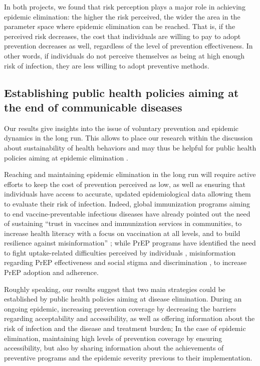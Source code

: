 In both projects, we found that risk perception plays a major role in achieving epidemic elimination: the higher the risk perceived, the wider the area in the parameter space where epidemic elimination can be reached. That is, if the perceived risk decreases, the cost that individuals are willing to pay to adopt prevention decreases as well, regardless of the level of prevention effectiveness. In other words, if individuals do not perceive themselves as being at high enough risk of infection, they are less willing to adopt preventive methods. 

\subsection{Establishing public health policies aiming at the end of communicable diseases}

Our results give insights into the issue of voluntary prevention and epidemic dynamics in the long run. This allows to place our research within the discussion about sustainability of health behaviors and may thus be helpful for public health policies aiming at epidemic elimination \cite[]{SDG_Goal3}.  

Reaching and maintaining epidemic elimination in the long run will require active efforts to keep the cost of prevention perceived as low, as well as ensuring that individuals have access to accurate, updated epidemiological data allowing them to evaluate their risk of infection. Indeed, global immunization programs aiming to end vaccine-preventable infectious diseases have already pointed out the need of sustaining ``trust in vaccines and immunization services in communities, to increase health literacy with a focus on vaccination at all levels, and to build resilience against misinformation'' \cite[]{WHO_IA2030}; while PrEP programs have identified the need to fight uptake-related difficulties perceived by individuals \cite[]{Desai2018,Sidebottom2018}, misinformation regarding PrEP effectiveness \cite[]{Young2014,Underhill2016} and social stigma and discrimination \cite[]{Young2014,PerezFigueroa2015,Arnold2016}, to increase PrEP adoption and adherence.

Roughly speaking, our results suggest that two main strategies could be established by public health policies aiming at disease elimination. During an ongoing epidemic, increasing prevention coverage by decreasing the barriers regarding acceptability and accessibility, as well as offering information about the risk of infection and the disease and treatment burden; In the case of epidemic elimination, maintaining high levels of prevention coverage by ensuring accessibility, but also by sharing information about  the achievements of preventive programs and the epidemic severity previous to their implementation. 

